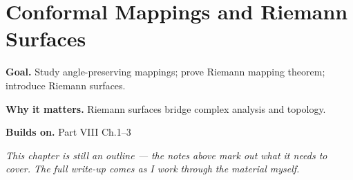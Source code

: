 \chapter{Conformal Mappings and Riemann Surfaces}
\label{ch:08-complex-analysis-and-harmonic-analysis-04}

\begin{chapterintro}
\textbf{Goal.} Study angle-preserving mappings; prove Riemann mapping theorem; introduce Riemann surfaces.

\textbf{Why it matters.} Riemann surfaces bridge complex analysis and topology.

\textbf{Builds on.} Part VIII Ch.1–3
\end{chapterintro}

\textit{This chapter is still an outline --- the notes above mark out what it needs to cover. The full write-up comes as I work through the material myself.}
